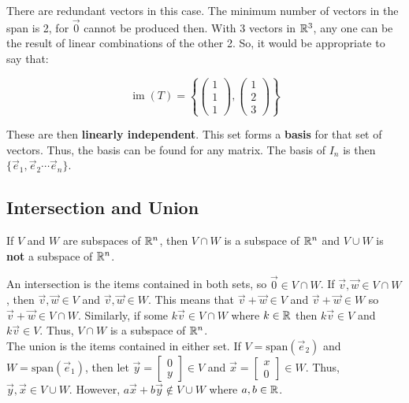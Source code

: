 There are redundant vectors in this case. The minimum number of vectors in the span is 2, 
for $\vec{0}$ cannot be produced then. With 3 vectors in $\mathbb{R}^3$, any one can be the result of linear combinations of the other 2.
So, it would be appropriate to say that:

\[\operatorname{im}(T)=\left\{\left(\begin{array}{l}
    1 \\
    1 \\
    1
    \end{array}\right),\left(\begin{array}{l}
    1 \\
    2 \\
    3
    \end{array}\right)\right\}\]

These are then \textbf{linearly independent}. This set forms a \textbf{basis} for that set of vectors.
Thus, the basis can be found for any matrix. The basis of $I_n$ is then $\{\vec{e}_1,\vec{e}_2\cdots \vec{e}_n\}$.

\subsection{Intersection and Union}

\begin{framed}
    \noindent If $V$ and $W$ are subspaces of $\mathbb{R}^n$, then $V\cap W$ 
    is a subspace of $\mathbb{R}^n$ and $V\cup W$ is \textbf{not} a subspace of $\mathbb{R}^n$.
\end{framed}

\noindent
An intersection is the items contained in both sets, so $\vec{0}\in V\cap W$.
If $\vec{v},\vec{w}\in V\cap W$, then $\vec{v},\vec{w}\in V$ and $\vec{v},\vec{w}\in W$. This means that
$\vec{v}+\vec{w}\in V$ and $\vec{v}+\vec{w}\in W$ so $\vec{v}+\vec{w}\in V\cap W$.
Similarly, if some $k\vec{v}\in V\cap W$ where $k\in \mathbb{R}$ then $k\vec{v}\in V$ and $k\vec{v}\in V$. 
Thus, $V\cap W$ is a subspace of $\mathbb{R}^n$.\\

\noindent
The union is the items contained in either set.
If $V=\mathrm{span}(\vec{e}_2)$ and $W=\mathrm{span}(\vec{e}_1)$, then let $\vec{y}=\begin{bmatrix}0\\ y\end{bmatrix}\in V$
and $\vec{x}=\begin{bmatrix}x\\ 0\end{bmatrix}\in W$. Thus, $\vec{y},\vec{x}\in V\cup W$. However,
$a\vec{x}+b\vec{y}\notin V\cup W$ where $a,b\in \mathbb{R}$.